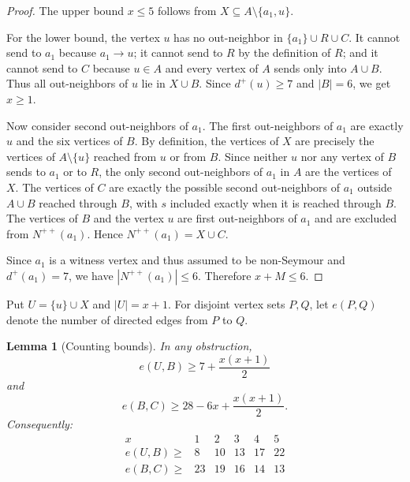 \documentclass[a4paper,fleqn]{cas-sc}
\newtheorem{lemma}[theorem]{Lemma}
\theoremstyle{definition}
\begin{document}
\begin{proof}
The upper bound $x\le 5$ follows from $X\subseteq A\setminus\{a_1,u\}$.

For the lower bound, the vertex $u$ has no out-neighbor in $\{a_1\}\cup R\cup C$. It cannot send to $a_1$ because $a_1\to u$; it cannot send to $R$ by the definition of $R$; and it cannot send to $C$ because $u\in A$ and every vertex of $A$ sends only into $A\cup B$. Thus all out-neighbors of $u$ lie in $X\cup B$. Since $d^+(u)\ge 7$ and $|B|=6$, we get $x\ge 1$.

Now consider second out-neighbors of $a_1$. The first out-neighbors of $a_1$ are exactly $u$ and the six vertices of $B$. By definition, the vertices of $X$ are precisely the vertices of $A\setminus\{u\}$ reached from $u$ or from $B$. Since neither $u$ nor any vertex of $B$ sends to $a_1$ or to $R$, the only second out-neighbors of $a_1$ in $A$ are the vertices of $X$. The vertices of $C$ are exactly the possible second out-neighbors of $a_1$ outside $A\cup B$ reached through $B$, with $s$ included exactly when it is reached through $B$. The vertices of $B$ and the vertex $u$ are first out-neighbors of $a_1$ and are excluded from $N^{++}(a_1)$. Hence $N^{++}(a_1)=X\cup C$.

Since $a_1$ is a witness vertex and thus assumed to be non-Seymour and $d^+(a_1)=7$, we have $|N^{++}(a_1)|\le 6$. Therefore $x+M\le 6$.
\end{proof}

Put $U=\{u\}\cup X$ and $|U|=x+1$.
For disjoint vertex sets $P,Q$, let $e(P,Q)$ denote the number of directed edges from $P$ to $Q$.

\begin{lemma}[Counting bounds]\label{lem:counting}
In any obstruction,
\[
e(U,B)\ge 7+\frac{x(x+1)}2
\]
and
\[
e(B,C)\ge 28-6x+\frac{x(x+1)}2.
\]
Consequently:
\[
\begin{array}{c|ccccc}
x&1&2&3&4&5\\ \hline
e(U,B)\ge&8&10&13&17&22\\
e(B,C)\ge&23&19&16&14&13
\end{array}
\]
\end{lemma}
\end{document}
